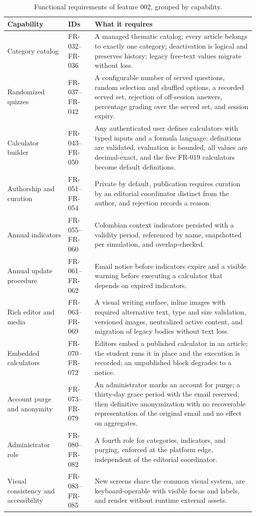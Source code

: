 \begin{table}[htbp]
  \centering
  \caption{Functional requirements of feature 002, grouped by capability.}
  \label{tab:fr-002}
  \begin{tabular}{@{}p{3.6cm}p{3.4cm}p{9.4cm}@{}}
    \hline
    Capability & IDs & What it requires \\
    \hline
    Category catalog & FR-032--FR-036 & A managed thematic catalog; every article belongs to
    exactly one category; deactivation is logical and preserves history; legacy free-text values
    migrate without loss. \\
    Randomized quizzes & FR-037--FR-042 & A configurable number of served questions, random
    selection and shuffled options, a recorded served set, rejection of off-session answers,
    percentage grading over the served set, and session expiry. \\
    Calculator builder & FR-043--FR-050 & Any authenticated user defines calculators with typed
    inputs and a formula language; definitions are validated, evaluation is bounded, all values
    are decimal-exact, and the five FR-019 calculators become default definitions. \\
    Authorship and curation & FR-051--FR-054 & Private by default, publication requires curation
    by an editorial coordinator distinct from the author, and rejection records a reason. \\
    Annual indicators & FR-055--FR-060 & Colombian context indicators persisted with a validity
    period, referenced by name, snapshotted per simulation, and overlap-checked. \\
    Annual update procedure & FR-061--FR-062 & Email notice before indicators expire and a visible
    warning before executing a calculator that depends on expired indicators. \\
    Rich editor and media & FR-063--FR-069 & A visual writing surface, inline images with required
    alternative text, type and size validation, versioned images, neutralized active content, and
    migration of legacy bodies without text loss. \\
    Embedded calculators & FR-070--FR-072 & Editors embed a published calculator in an article;
    the student runs it in place and the execution is recorded; an unpublished block degrades to a
    notice. \\
    Account purge and anonymity & FR-073--FR-079 & An administrator marks an account for purge;
    a thirty-day grace period with the email reserved; then definitive anonymization with no
    recoverable representation of the original email and no effect on aggregates. \\
    Administrator role & FR-080--FR-082 & A fourth role for categories, indicators, and purging,
    enforced at the platform edge, independent of the editorial coordinator. \\
    Visual consistency and accessibility & FR-083--FR-085 & New screens share the common visual
    system, are keyboard-operable with visible focus and labels, and render without runtime
    external assets. \\
    \hline
  \end{tabular}
\end{table}

